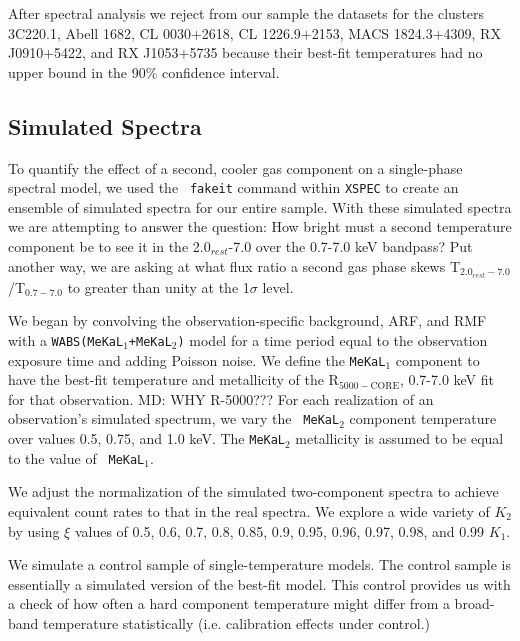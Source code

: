 \documentclass{emulateapj}
\newcommand{\hard}{T$_{2.0_{rest}-7.0}$ }
\newcommand{\full}{T$_{0.7-7.0}$ }
\begin{document}
{%


After spectral analysis we reject from our sample the datasets for the clusters 
3C220.1, Abell 1682, CL 0030+2618, CL 1226.9+2153, MACS 1824.3+4309, RX
J0910+5422, and RX J1053+5735 because their best-fit
temperatures had no upper bound in the 90\% confidence interval.

\subsection{Simulated Spectra}\label{sec:simulated}

To quantify the effect of a second, cooler gas
component on a single-phase spectral model, we used the {\tt
fakeit} command within {\tt XSPEC} to create an ensemble of simulated
spectra for our entire sample. With these simulated spectra we are
attempting to answer the question: How bright must a second
temperature component be to see it in the 2.0$_{rest}$-7.0 over the
0.7-7.0 keV bandpass?  Put another way, we are asking at what
flux ratio a second gas phase skews \hard/\full to
greater than unity at the 1$\sigma$ level.

We began by convolving the observation-specific background, ARF, and RMF
with a {\tt WABS(MeKaL$_{1}$+MeKaL$_{2}$)} model for a time period equal to
the observation exposure time and adding Poisson noise. We define the
{\tt MeKaL$_1$} component to have the best-fit temperature and metallicity of
the R$_{5000-\text{CORE}}$, 0.7-7.0 keV fit for that observation.
MD: WHY R-5000??? 
For each realization of an observation's simulated spectrum, we vary the {\tt
MeKaL$_2$} component temperature over values 0.5, 0.75, and 1.0 keV.
The {\tt MeKaL$_2$} metallicity is assumed to be equal to the value of {\tt
MeKaL$_1$}.

We adjust the normalization of the simulated two-component spectra to achieve
equivalent count rates to that in the real spectra.
We explore a wide variety of
$K_2$ by using $\xi$ values of 0.5, 0.6,
0.7, 0.8, 0.85, 0.9, 0.95, 0.96, 0.97, 0.98, and 0.99 $K_1$.

We simulate a control sample of single-temperature models. 
The control sample is essentially a simulated
version of the best-fit model. This control provides us with a check of how
often a hard component temperature might differ from a broad-band 
temperature statistically (i.e. calibration effects under control.)

}
\end{document}
